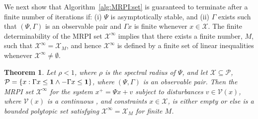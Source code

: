 \documentclass[journal]{IEEEtran}
\newcommand{\todo}[2]{%
  \providetoggle{#1}%
    \iftoggle{#1}{%
    {\color{red}#2}%
    }{#2}
}
\newcounter{thmcount}
\newtheorem{thm}[thmcount]{Theorem}
\theoremstyle{remark}
\theoremstyle{definition}
\begin{document}
%
We next show that Algorithm~\ref{alg:MRPI:set} is guaranteed to terminate after a finite number of iterations if:
%
(i) $\Psi$ is asymptotically stable, and 
%
(ii) $\Gamma$ exists such that $(\Psi,\Gamma)$ is an observable pair and $\Gamma x$ is finite whenever $x\in\mathcal{X}$.
%
%
%
The finite determinability of the MRPI set
$\mathcal X^\infty$ implies that there exists a finite number, $M$, such 
that $\mathcal X^\infty = \mathcal X_M$, and hence  $\mathcal{X}^\infty$ is defined by a finite set of linear inequalities whenever $\mathcal X^\infty\neq \emptyset$.
%
%
\begin{thm}\label{thm:finite:MRPI:set:state:dependable}
Let $\rho < 1$, where $\rho$ is the spectral radius of $\Psi$, and let $\mathcal{X}\subseteq\mathcal{P}$, $\mathcal{P}=\{x:\Gamma x\leq{\bf{1}}\wedge 
-\Gamma x\leq{\bf{1}}\}$, where $(\Psi,\Gamma)$ is an observable pair.
%
Then the MRPI set $\mathcal X^\infty$ for the system $x^+ = \Psi x + v$ subject to disturbances $v\in\mathcal{V}(x)$, where $\mathcal V(x)$ is a continuous \todo{Manuel:thm14:ref}{and piece-wise affine point-to-set map as defined in~\eqref{eq:definition:PWA:polytopic:set:cl}}, and constraints $x\in\mathcal{X}$, is either empty or else is a bounded polytopic set satisfying $\mathcal X^\infty =\mathcal X_M$ for finite $M$.
\end{thm}
%
%
\end{document}
